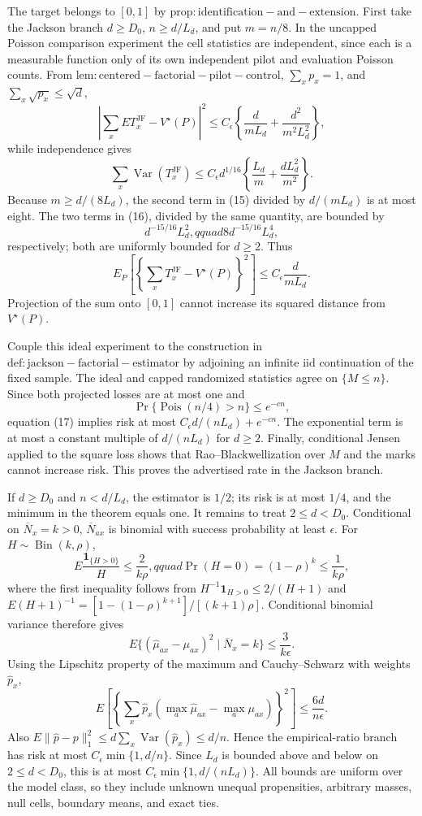 The target belongs to \([0,1]\) by \(\mathrm{prop:identification-and-extension}\).  First take the Jackson branch \(d\geq D_0\), \(n\geq d/L_d\), and put \(m=n/8\).  In the uncapped Poisson comparison experiment the cell statistics are independent, since each is a measurable function only of its own independent pilot and evaluation Poisson counts.  From \(\mathrm{lem:centered-factorial-pilot-control}\), \(\sum_xp_x=1\), and \(\sum_x\sqrt{p_x}\leq\sqrt d\),
\[
 \left|\sum_xE T_x^{\mathrm{JF}}-V^\star(P)\right|^2
 \leq C_\epsilon\left\{\frac d{mL_d}+\frac{d^2}{m^2L_d^2}\right\}, \tag{15}
\]
while independence gives
\[
 \sum_x\operatorname{Var}(T_x^{\mathrm{JF}})
 \leq C_\epsilon d^{1/16}\left\{\frac{L_d}{m}+\frac{dL_d^2}{m^2}\right\}. \tag{16}
\]
Because \(m\geq d/(8L_d)\), the second term in (15) divided by \(d/(mL_d)\) is at most eight.  The two terms in (16), divided by the same quantity, are bounded by
\[
 d^{-15/16}L_d^2,qquad 8d^{-15/16}L_d^4,
\]
respectively; both are uniformly bounded for \(d\geq2\).  Thus
\[
 E_P\left[\left\{\sum_xT_x^{\mathrm{JF}}-V^\star(P)\right\}^2\right]
 \leq C_\epsilon\frac d{mL_d}.                                      \tag{17}
\]
Projection of the sum onto \([0,1]\) cannot increase its squared distance from \(V^\star(P)\).

Couple this ideal experiment to the construction in \(\mathrm{def:jackson-factorial-estimator}\) by adjoining an infinite iid continuation of the fixed sample.  The ideal and capped randomized statistics agree on \(\{M\leq n\}\).  Since both projected losses are at most one and
\[
 \Pr\{\operatorname{Pois}(n/4)>n\}\leq e^{-c n},
\]
equation (17) implies risk at most \(C_\epsilon d/(nL_d)+e^{-cn}\).  The exponential term is at most a constant multiple of \(d/(nL_d)\) for \(d\geq2\).  Finally, conditional Jensen applied to the square loss shows that Rao--Blackwellization over \(M\) and the marks cannot increase risk.  This proves the advertised rate in the Jackson branch.

If \(d\geq D_0\) and \(n<d/L_d\), the estimator is \(1/2\); its risk is at most \(1/4\), and the minimum in the theorem equals one.  It remains to treat \(2\leq d<D_0\).  Conditional on \(\overline N_x=k>0\), \(\overline N_{ax}\) is binomial with success probability at least \(\epsilon\).  For \(H\sim\operatorname{Bin}(k,\rho)\),
\[
 E\frac{\mathbf1_{\{H>0\}}}{H}\leq\frac2{k\rho},qquad
 \Pr(H=0)=(1-\rho)^k\leq\frac1{k\rho},
\]
where the first inequality follows from \(H^{-1}\mathbf1_{H>0}\leq2/(H+1)\) and
\(E(H+1)^{-1}=[1-(1-\rho)^{k+1}]/[(k+1)\rho]\).  Conditional binomial variance therefore gives
\[
 E\{(\widehat\mu_{ax}-\mu_{ax})^2\mid\overline N_x=k\}\leq\frac3{k\epsilon}.
\]
Using the Lipschitz property of the maximum and Cauchy--Schwarz with weights \(\widehat p_x\),
\[
 E\left[\left\{\sum_x\widehat p_x(\max_a\widehat\mu_{ax}-\max_a\mu_{ax})\right\}^2\right]
 \leq\frac{6d}{n\epsilon}.
\]
Also \(E\|\widehat p-p\|_1^2\leq d\sum_x\operatorname{Var}(\widehat p_x)\leq d/n\).  Hence the empirical-ratio branch has risk at most \(C_\epsilon\min\{1,d/n\}\).  Since \(L_d\) is bounded above and below on \(2\leq d<D_0\), this is at most \(C_\epsilon\min\{1,d/(nL_d)\}\).  All bounds are uniform over the model class, so they include unknown unequal propensities, arbitrary masses, null cells, boundary means, and exact ties.